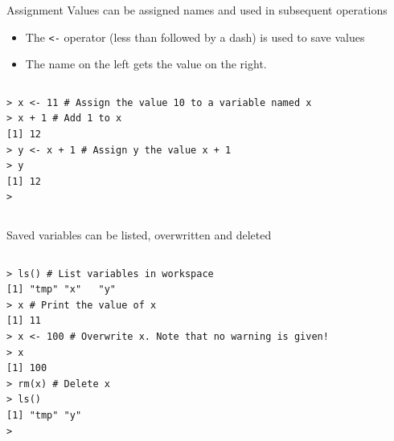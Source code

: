 \documentclass[table,smaller]{beamer}
\begin{document}
\begin{frame}[fragile,label=sec-3-1]{Assignment}
 Values can be assigned names and used in subsequent operations
\begin{itemize}
\item The \verb~<-~ operator (less than followed by a dash) is used to save values
\item The name on the left gets the value on the right.
\end{itemize}

\vspace{-.5em}
\begin{columns}
\begin{block}{}
\begin{verbatim}
> x <- 11 # Assign the value 10 to a variable named x
> x + 1 # Add 1 to x
[1] 12
> y <- x + 1 # Assign y the value x + 1
> y
[1] 12
>
\end{verbatim}
\end{block}
\end{columns}
\vspace{.5em}


Saved variables can be listed, overwritten and deleted
\vspace{-.5em}
\begin{columns}
\begin{block}{}
\begin{verbatim}
> ls() # List variables in workspace
[1] "tmp" "x"   "y"  
> x # Print the value of x
[1] 11
> x <- 100 # Overwrite x. Note that no warning is given!
> x
[1] 100
> rm(x) # Delete x
> ls()
[1] "tmp" "y"  
>
\end{verbatim}
\end{block}
\end{columns}
\vspace{.5em}
\end{frame}
\end{document}
